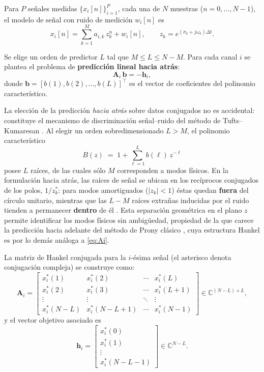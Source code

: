 Para $P$ señales medidas $\{x_i[n]\}_{i=1}^P$, cada una de $N$ muestras ($n=0,\dots,N-1$), el modelo de señal con ruido de medición $w_i[n]$ es
\[
x_i[n] = \sum_{k=1}^{M} a_{i,k}\, z_k^n + w_i[n], \qquad z_k = e^{(\sigma_k + j\omega_k)\Delta t}.
\]

Se elige un orden de predictor $L$ tal que $M \le L \le N-M$. Para cada canal $i$ se plantea el problema de \textbf{predicción lineal hacia atrás}:
\begin{equation}
\mathbf{A}_i\,\mathbf{b} = -\mathbf{h}_i,
\label{eq:backward_pred}
\end{equation}
donde $\mathbf{b}=[b(1),b(2),\dots,b(L)]^\top$ es el vector de coeficientes del polinomio característico.

La elección de la predicción \textit{hacia atrás} sobre datos conjugados
no es accidental: constituye el mecanismo de discriminación señal--ruido
del método de Tufts--Kumaresan \cite{tufts1982}. Al elegir un orden
sobredimensionado $L > M$, el polinomio característico
\begin{equation}
    B(z) \;=\; 1 + \sum_{\ell=1}^{L} b(\ell)\, z^{-\ell}
    \label{eq:charpoly}
\end{equation}
posee $L$ raíces, de las cuales sólo $M$ corresponden a modos físicos. En
la formulación hacia atrás, las raíces de señal se ubican en los
recíprocos conjugados de los polos, $1/z_k^*$: para modos amortiguados
($|z_k|<1$) éstas quedan \textbf{fuera} del círculo unitario, mientras que
las $L-M$ raíces extrañas inducidas por el ruido tienden a permanecer
\textbf{dentro} de él \cite{tufts1982}. Esta separación geométrica en el
plano $z$ permite identificar los modos físicos sin ambigüedad, propiedad
de la que carece la predicción hacia adelante del método de Prony clásico
\cite{sauer2017,hauer1990}, cuya estructura Hankel es por lo demás análoga
a \eqref{eq:Ai}.

La matriz de Hankel conjugada para la $i$-ésima señal (el asterisco denota
conjugación compleja) se construye como:
\begin{equation}
\mathbf{A}_i =
\begin{bmatrix}
x_i^*(1)   & x_i^*(2)   & \cdots & x_i^*(L) \\
x_i^*(2)   & x_i^*(3)   & \cdots & x_i^*(L+1) \\
\vdots     & \vdots     & \ddots & \vdots   \\
x_i^*(N-L) & x_i^*(N-L+1) & \cdots & x_i^*(N-1)
\end{bmatrix}
\in \mathbb{C}^{(N-L)\times L},
\label{eq:Ai}
\end{equation}
y el vector objetivo asociado es
\begin{equation}
\mathbf{h}_i =
\begin{bmatrix}
x_i^*(0) \\ x_i^*(1) \\ \vdots \\ x_i^*(N-L-1)
\end{bmatrix}
\in \mathbb{C}^{N-L}.
\label{eq:hi}
\end{equation}

